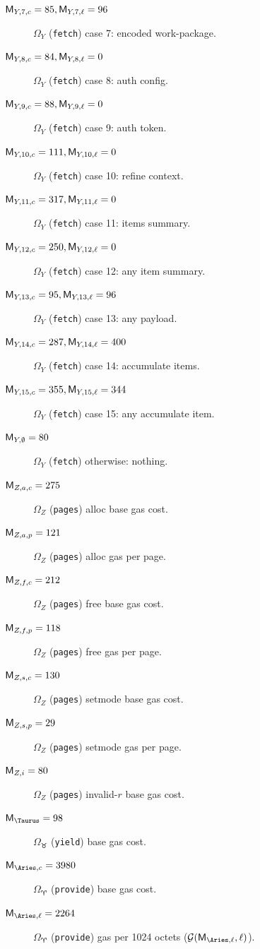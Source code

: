 \begin{description}
  \item[$\mathsf{M}_{Y,7,c} = 85, \mathsf{M}_{Y,7,\ell} = 96$] $\Omega_Y$ (\texttt{fetch}) case 7: encoded work-package.
  \item[$\mathsf{M}_{Y,8,c} = 84, \mathsf{M}_{Y,8,\ell} = 0$] $\Omega_Y$ (\texttt{fetch}) case 8: auth config.
  \item[$\mathsf{M}_{Y,9,c} = 88, \mathsf{M}_{Y,9,\ell} = 0$] $\Omega_Y$ (\texttt{fetch}) case 9: auth token.
  \item[$\mathsf{M}_{Y,10,c} = 111, \mathsf{M}_{Y,10,\ell} = 0$] $\Omega_Y$ (\texttt{fetch}) case 10: refine context.
  \item[$\mathsf{M}_{Y,11,c} = 317, \mathsf{M}_{Y,11,\ell} = 0$] $\Omega_Y$ (\texttt{fetch}) case 11: items summary.
  \item[$\mathsf{M}_{Y,12,c} = 250, \mathsf{M}_{Y,12,\ell} = 0$] $\Omega_Y$ (\texttt{fetch}) case 12: any item summary.
  \item[$\mathsf{M}_{Y,13,c} = 95, \mathsf{M}_{Y,13,\ell} = 96$] $\Omega_Y$ (\texttt{fetch}) case 13: any payload.
  \item[$\mathsf{M}_{Y,14,c} = 287, \mathsf{M}_{Y,14,\ell} = 400$] $\Omega_Y$ (\texttt{fetch}) case 14: accumulate items.
  \item[$\mathsf{M}_{Y,15,c} = 355, \mathsf{M}_{Y,15,\ell} = 344$] $\Omega_Y$ (\texttt{fetch}) case 15: any accumulate item.
  \item[$\mathsf{M}_{Y,\emptyset} = 80$] $\Omega_Y$ (\texttt{fetch}) otherwise: nothing.
  \item[$\mathsf{M}_{Z,a,c} = 275$] $\Omega_Z$ (\texttt{pages}) alloc base gas cost.
  \item[$\mathsf{M}_{Z,a,p} = 121$] $\Omega_Z$ (\texttt{pages}) alloc gas per page.
  \item[$\mathsf{M}_{Z,f,c} = 212$] $\Omega_Z$ (\texttt{pages}) free base gas cost.
  \item[$\mathsf{M}_{Z,f,p} = 118$] $\Omega_Z$ (\texttt{pages}) free gas per page.
  \item[$\mathsf{M}_{Z,s,c} = 130$] $\Omega_Z$ (\texttt{pages}) setmode base gas cost.
  \item[$\mathsf{M}_{Z,s,p} = 29$] $\Omega_Z$ (\texttt{pages}) setmode gas per page.
  \item[$\mathsf{M}_{Z,i} = 80$] $\Omega_Z$ (\texttt{pages}) invalid-$r$ base gas cost.
  \item[$\CgasTaurus = 98$] $\Omega_\Taurus$ (\texttt{yield}) base gas cost.
  \item[$\CgasAriesconst = 3980$] $\Omega_\Aries$ (\texttt{provide}) base gas cost.
  \item[$\CgasArieslinear = 2264$] $\Omega_\Aries$ (\texttt{provide}) gas per 1024 octets ($\fnmemgas(\CgasArieslinear, \ell)$).

\end{description}
